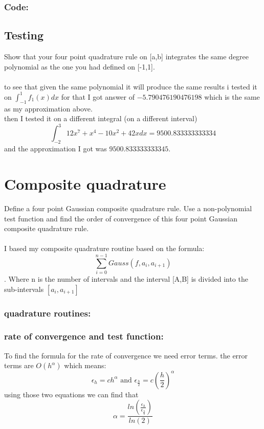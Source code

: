\documentclass{article}
\begin{document}
	\subsubsection*{Code:}
		
	\subsection{Testing}
		Show that your four point quadrature rule on [a,b] integrates the same degree polynomial as the one you had defined on [-1,1].\\\\
		
		to see that given the same polynomial it will produce the same results i tested it on $\int_{-1}^1f_1(x)dx$ for that I got answer of $-5.790476190476198$ which is the same as my approximation above.\\
		then I tested it on a different integral (on a different interval) 
		$$\int_{-2}^{3} 12x^7 + x^4 - 10x^2+ 42x dx = 9500.833333333334$$
		 and the approximation I got was $9500.833333333345$.
		 


\section{Composite quadrature}
	Define a four point Gaussian composite quadrature rule. Use a non-polynomial test
	function and find the order of convergence of this four point Gaussian composite
	quadrature rule. \\\\
	I based my composite quadrature routine based on the formula: $$\sum_{i=0}^{n-1}Gauss(f,a_{i}, a_{i+1})$$. Where n is the number of intervals and the interval [A,B] is divided into the sub-intervals $[a_{i},a_{i+1}]$
	
	\subsubsection*{quadrature routines:}
		
	\subsubsection*{rate of convergence and test function:}
		To find the formula for the rate of convergence we need  error terms.  the error terms are $O(h^{\alpha})$ which means:
		$$\epsilon_h = ch^{\alpha} \text{ and } \epsilon_{\frac{h}{2}} = c\left(\frac{h}{2}\right)^{\alpha}$$
		using those two equations we can find that 
		$$\alpha = \frac{ln\left(\frac{\epsilon_h}{\epsilon_{\frac{h}{2}}}\right)}{ln(2)}$$
		
\end{document}

